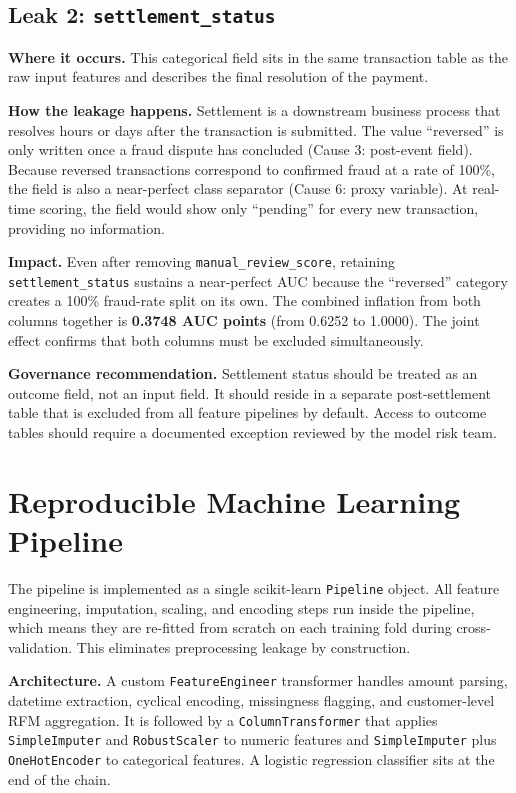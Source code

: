 \documentclass[11pt,a4paper]{article}
\begin{document}
\subsection*{Leak 2: \texttt{settlement\_status}}

\textbf{Where it occurs.} This categorical field sits in the same transaction table as the
raw input features and describes the final resolution of the payment.

\textbf{How the leakage happens.} Settlement is a downstream business process that
resolves hours or days after the transaction is submitted. The value ``reversed'' is only
written once a fraud dispute has concluded (Cause 3: post-event field). Because reversed
transactions correspond to confirmed fraud at a rate of 100\%, the field is also a
near-perfect class separator (Cause 6: proxy variable). At real-time scoring, the field
would show only ``pending'' for every new transaction, providing no information.

\textbf{Impact.} Even after removing \texttt{manual\_review\_score}, retaining
\texttt{settlement\_status} sustains a near-perfect AUC because the ``reversed'' category
creates a 100\% fraud-rate split on its own. The combined inflation from both columns
together is \textbf{0.3748 AUC points} (from 0.6252 to 1.0000). The joint effect confirms
that both columns must be excluded simultaneously.

\textbf{Governance recommendation.} Settlement status should be treated as an outcome
field, not an input field. It should reside in a separate post-settlement table that is
excluded from all feature pipelines by default. Access to outcome tables should require a
documented exception reviewed by the model risk team.

\section{Reproducible Machine Learning Pipeline}

The pipeline is implemented as a single scikit-learn \texttt{Pipeline} object. All
feature engineering, imputation, scaling, and encoding steps run inside the pipeline,
which means they are re-fitted from scratch on each training fold during cross-validation.
This eliminates preprocessing leakage by construction.

\textbf{Architecture.} A custom \texttt{FeatureEngineer} transformer handles amount
parsing, datetime extraction, cyclical encoding, missingness flagging, and customer-level
RFM aggregation. It is followed by a \texttt{ColumnTransformer} that applies
\texttt{SimpleImputer} and \texttt{RobustScaler} to numeric features and
\texttt{SimpleImputer} plus \texttt{OneHotEncoder} to categorical features. A logistic
regression classifier sits at the end of the chain.
\end{document}
